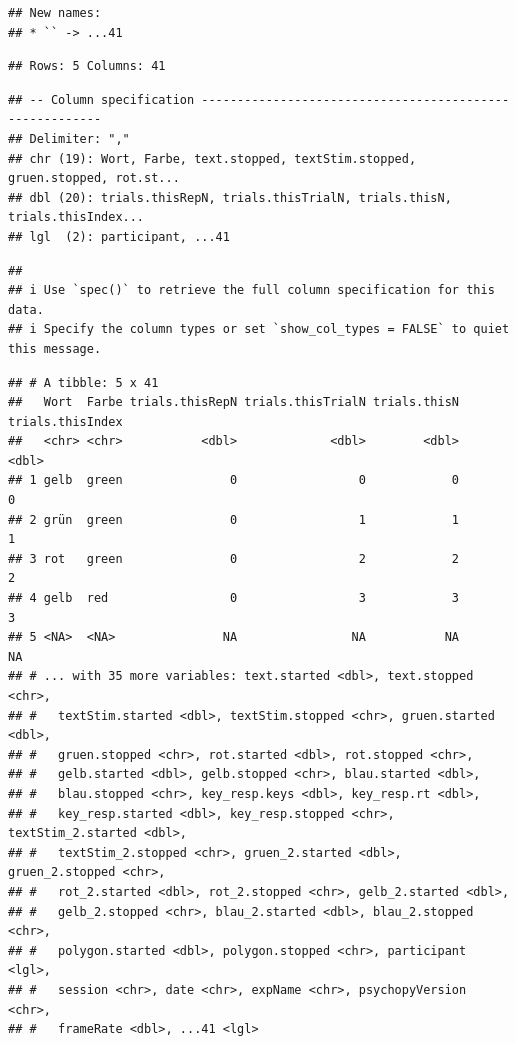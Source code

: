 \documentclass[
]{book}
\begin{document}
\begin{verbatim}
## New names:
## * `` -> ...41
\end{verbatim}

\begin{verbatim}
## Rows: 5 Columns: 41
\end{verbatim}

\begin{verbatim}
## -- Column specification --------------------------------------------------------
## Delimiter: ","
## chr (19): Wort, Farbe, text.stopped, textStim.stopped, gruen.stopped, rot.st...
## dbl (20): trials.thisRepN, trials.thisTrialN, trials.thisN, trials.thisIndex...
## lgl  (2): participant, ...41
\end{verbatim}

\begin{verbatim}
## 
## i Use `spec()` to retrieve the full column specification for this data.
## i Specify the column types or set `show_col_types = FALSE` to quiet this message.
\end{verbatim}

\begin{verbatim}
## # A tibble: 5 x 41
##   Wort  Farbe trials.thisRepN trials.thisTrialN trials.thisN trials.thisIndex
##   <chr> <chr>           <dbl>             <dbl>        <dbl>            <dbl>
## 1 gelb  green               0                 0            0                0
## 2 grün  green               0                 1            1                1
## 3 rot   green               0                 2            2                2
## 4 gelb  red                 0                 3            3                3
## 5 <NA>  <NA>               NA                NA           NA               NA
## # ... with 35 more variables: text.started <dbl>, text.stopped <chr>,
## #   textStim.started <dbl>, textStim.stopped <chr>, gruen.started <dbl>,
## #   gruen.stopped <chr>, rot.started <dbl>, rot.stopped <chr>,
## #   gelb.started <dbl>, gelb.stopped <chr>, blau.started <dbl>,
## #   blau.stopped <chr>, key_resp.keys <dbl>, key_resp.rt <dbl>,
## #   key_resp.started <dbl>, key_resp.stopped <chr>, textStim_2.started <dbl>,
## #   textStim_2.stopped <chr>, gruen_2.started <dbl>, gruen_2.stopped <chr>,
## #   rot_2.started <dbl>, rot_2.stopped <chr>, gelb_2.started <dbl>,
## #   gelb_2.stopped <chr>, blau_2.started <dbl>, blau_2.stopped <chr>,
## #   polygon.started <dbl>, polygon.stopped <chr>, participant <lgl>,
## #   session <chr>, date <chr>, expName <chr>, psychopyVersion <chr>,
## #   frameRate <dbl>, ...41 <lgl>
\end{verbatim}
\end{document}
